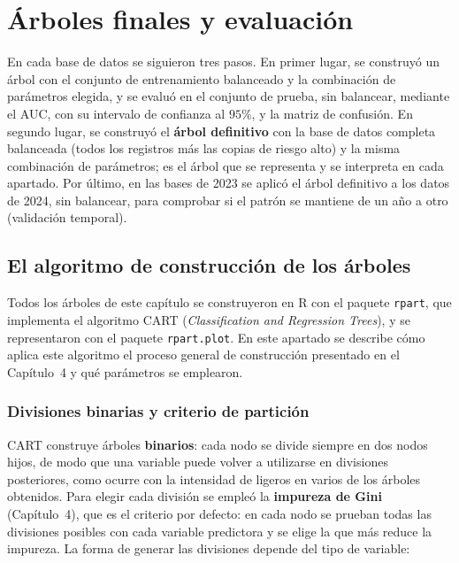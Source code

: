 \documentclass[twoside,a4paper,12pt,onecolumn,openany]{book}
\begin{document}
\section{Árboles finales y evaluación}
\label{sec:arboles_finales}
 
En cada base de datos se siguieron tres pasos. En primer lugar, se construyó un árbol con el conjunto de entrenamiento balanceado y la combinación de parámetros elegida, y se evaluó en el conjunto de prueba, sin balancear, mediante el AUC, con su intervalo de confianza al $95\%$, y la matriz de confusión. En segundo lugar, se construyó el \textbf{árbol definitivo} con la base de datos completa balanceada (todos los registros más las copias de riesgo alto) y la misma combinación de parámetros; es el árbol que se representa y se interpreta en cada apartado. Por último, en las bases de 2023 se aplicó el árbol definitivo a los datos de 2024, sin balancear, para comprobar si el patrón se mantiene de un año a otro (validación temporal).

\setcounter{subsection}{-1}
\subsection{El algoritmo de construcción de los árboles}
\label{sec:rpart}
 
Todos los árboles de este capítulo se construyeron en R con el paquete \texttt{rpart}, que implementa el algoritmo CART (\textit{Classification and Regression Trees}), y se representaron con el paquete \texttt{rpart.plot}. En este apartado se describe cómo aplica este algoritmo el proceso general de construcción presentado en el Capítulo~4 y qué parámetros se emplearon.
 
\subsubsection*{Divisiones binarias y criterio de partición}
 
CART construye árboles \textbf{binarios}: cada nodo se divide siempre en dos nodos hijos, de modo que una variable puede volver a utilizarse en divisiones posteriores, como ocurre con la intensidad de ligeros en varios de los árboles obtenidos. Para elegir cada división se empleó la \textbf{impureza de Gini} (Capítulo~4), que es el criterio por defecto: en cada nodo se prueban todas las divisiones posibles con cada variable predictora y se elige la que más reduce la impureza. La forma de generar las divisiones depende del tipo de variable:
 
\end{document}
